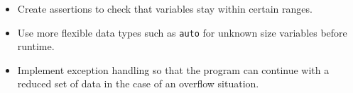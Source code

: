 \begin{itemize}
	\item Create assertions to check that variables stay within certain ranges.
	\item Use more flexible data types such as \texttt{auto} for unknown size variables before runtime.
	\item Implement exception handling so that the program can continue with a reduced set of data in the case of an overflow situation.
\end{itemize}



 




